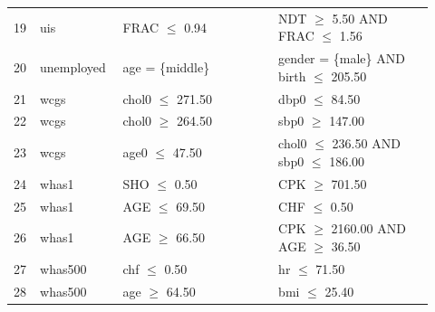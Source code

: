 \begin{longtable}{@{}p{0.04\linewidth}p{0.18\linewidth}p{0.35\linewidth}p{0.35\linewidth}@{}}
19 & uis & FRAC $\leq$ 0.94 & NDT $\geq$ 5.50 AND FRAC $\leq$ 1.56 \\
20 & unemployed & age = \{middle\} & gender = \{male\} AND birth $\leq$ 205.50 \\
21 & wcgs & chol0 $\leq$ 271.50 & dbp0 $\leq$ 84.50 \\
22 & wcgs & chol0 $\geq$ 264.50 & sbp0 $\geq$ 147.00 \\
23 & wcgs & age0 $\leq$ 47.50 & chol0 $\leq$ 236.50 AND sbp0 $\leq$ 186.00 \\
24 & whas1 & SHO $\leq$ 0.50 & CPK $\geq$ 701.50 \\
25 & whas1 & AGE $\leq$ 69.50 & CHF $\leq$ 0.50 \\
26 & whas1 & AGE $\geq$ 66.50 & CPK $\geq$ 2160.00 AND AGE $\geq$ 36.50 \\
27 & whas500 & chf $\leq$ 0.50 & hr $\leq$ 71.50 \\
28 & whas500 & age $\geq$ 64.50 & bmi $\leq$ 25.40 \\
\bottomrule
\end{longtable}
\endgroup





